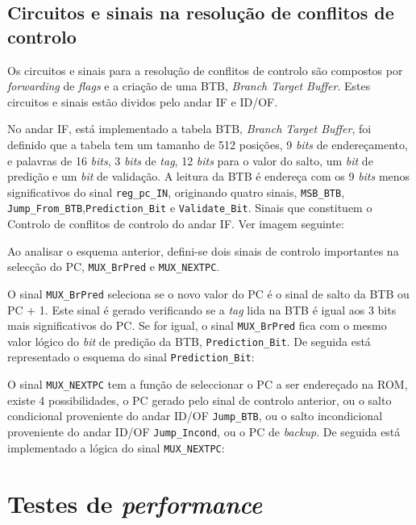 \documentclass[11pt]{article}
\numberwithin{equation}{section}
\begin{document}
\subsection{Circuitos e sinais na resolução de conflitos de controlo}

	Os circuitos e sinais para a resolução de conflitos de controlo são compostos por \textit{forwarding} de \textit{flags} e a criação de uma BTB, \textit{Branch Target Buffer}.  Estes circuitos e sinais estão dividos pelo andar IF e ID/OF.
	
	No andar IF, está implementado a tabela BTB, \textit{Branch Target Buffer}, foi definido que a tabela tem um tamanho de 512 posições, 9 \textit{bits} de endereçamento, e palavras de 16 \textit{bits}, 3 \textit{bits} de \textit{tag}, 12 \textit{bits} para o valor do salto, um \textit{bit} de predição e um \textit{bit} de validação.
	A leitura da BTB é endereça com os 9 \textit{bits} menos significativos do sinal \texttt{reg\_pc\_IN}, originando quatro sinais, \texttt{MSB\_BTB}, \texttt{Jump\_From\_BTB},\texttt{Prediction\_Bit} e \texttt{Validate\_Bit}. Sinais que constituem o Controlo de conflitos de controlo do andar IF. Ver imagem seguinte:
	
	
	Ao analisar o esquema anterior, defini-se dois sinais de controlo importantes na selecção do PC, \texttt{MUX\_BrPred} e \texttt{MUX\_NEXTPC}. 
	
	O sinal \texttt{MUX\_BrPred} seleciona se o novo valor do PC é o sinal de salto da BTB ou PC + 1. Este sinal é gerado verificando se a \textit{tag} lida na BTB é igual aos 3 bits mais significativos do PC. Se for igual, o sinal  \texttt{MUX\_BrPred} fica com o mesmo valor lógico do \textit{bit} de predição da BTB, \texttt{Prediction\_Bit}. De seguida está representado o esquema do sinal \texttt{Prediction\_Bit}:
	
	
	O sinal \texttt{MUX\_NEXTPC} tem a função de seleccionar o PC a ser endereçado na ROM, existe 4 possibilidades, o PC gerado pelo sinal de controlo anterior, ou o salto condicional proveniente do andar ID/OF \texttt{Jump\_BTB}, ou o salto incondicional proveniente do andar ID/OF \texttt{Jump\_Incond}, ou o PC de \textit{backup}. De seguida está implementado a lógica do sinal  \texttt{MUX\_NEXTPC}:
	
	    

\section{Testes de \textit{performance}}
\end{document}
